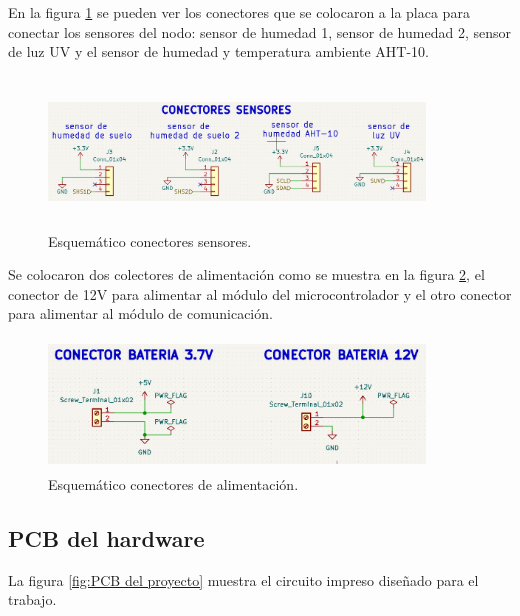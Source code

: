 En la figura \ref{fig:esquematico conectores sensores} se pueden ver los conectores que se colocaron a la placa para conectar los sensores del nodo: sensor de humedad 1, sensor de humedad 2, sensor de luz UV y el sensor de humedad y temperatura ambiente AHT-10.
\begin{figure}[h!]
  \centering
	\includegraphics[width=10cm, height=4cm]{./Figures/conectores_sensores.png}
	\caption{Esquemático conectores sensores.}
	\label{fig:esquematico conectores sensores}
\end{figure}


Se colocaron dos colectores de alimentación como se muestra en la figura \ref{fig:esquematico conectores alimentacion}, el conector de 12V para alimentar al módulo del microcontrolador y el otro conector para alimentar al módulo de comunicación.
\begin{figure}[h!]
  \centering
	\includegraphics[width=10cm, height=3.5cm]{./Figures/esquematico_alimentacion.png}
	\caption{Esquemático conectores de alimentación.}
	\label{fig:esquematico conectores alimentacion}
\end{figure}

\subsection{PCB del hardware} 
La figura \ref{fig:PCB del proyecto} muestra el circuito impreso diseñado para el trabajo.

